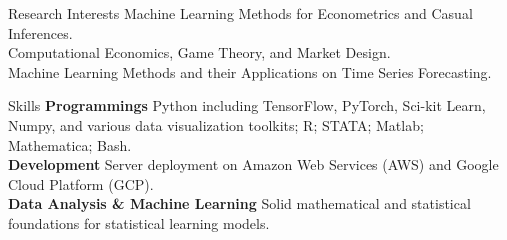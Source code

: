 \documentclass{resume} %
\begin{document}
\begin{rSection}{Research Interests}
Machine Learning Methods for Econometrics and Casual Inferences.
\\Computational Economics, Game Theory, and Market Design.
\\Machine Learning Methods and their Applications on Time Series Forecasting.
\end{rSection}

\begin{rSection}{Skills}
\textbf{Programmings} Python including TensorFlow, PyTorch, Sci-kit Learn, Numpy, and various data visualization toolkits; R; STATA; Matlab; Mathematica; Bash.
\\\textbf{Development} Server deployment on Amazon Web Services (AWS) and Google Cloud Platform (GCP).
\\\textbf{Data Analysis \& Machine Learning} Solid mathematical and statistical foundations for statistical learning models.
\end{rSection}


%
%
%



%
\end{document}
